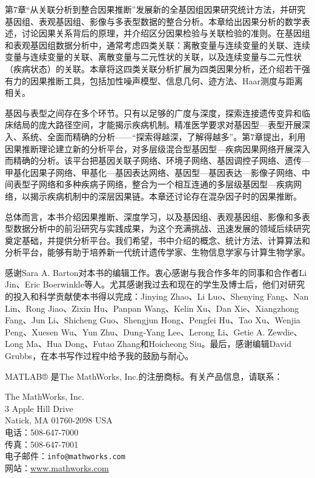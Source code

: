第7章“从关联分析到整合因果推断”发展新的全基因组因果研究统计方法，并研究基因组、表观基因组、影像与多表型数据的整合分析。本章给出因果分析的数学表述，讨论因果关系背后的原理，并介绍区分因果检验与关联检验的准则。在基因组和表观基因组数据分析中，通常考虑四类关联：离散变量与连续变量的关联、连续变量与连续变量的关联、离散变量与二元性状的关联，以及连续变量与二元性状（疾病状态）的关联。本章将这四类关联分析扩展为四类因果分析，还介绍若干强有力的因果推断工具，包括加性噪声模型、信息几何、迹方法、Haar测度与距离相关。

基因与表型之间存在多个环节。只有以足够的广度与深度，探索连接遗传变异和临床结局的庞大路径空间，才能揭示疾病机制。精准医学要求对基因型—表型开展深入、系统、全面而精确的分析——“探索得越深，了解得越多”。第7章提出，利用因果推断理论建立新的分析平台，对多层级混合型基因型—疾病因果网络开展深入而精确的分析。该平台把基因关联子网络、环境子网络、基因调控子网络、遗传—甲基化因果子网络、甲基化—基因表达网络、基因型—基因表达—影像子网络、中间表型子网络和多种疾病子网络，整合为一个相互连通的多层级基因型—疾病网络，以揭示疾病机制中的深层因果链。本章还讨论存在混杂因子时的因果推断。

总体而言，本书介绍因果推断、深度学习，以及基因组、表观基因组、影像和多表型数据分析中的前沿研究与实践成果，为这个充满挑战、迅速发展的领域后续研究奠定基础，并提供分析平台。我们希望，书中介绍的概念、统计方法、计算算法和分析平台，能够有助于培养新一代统计遗传学家、生物信息学家与计算生物学家。

感谢Sara A. Barton对本书的编辑工作。衷心感谢与我合作多年的同事和合作者Li Jin、Eric Boerwinkle等人。尤其感谢我过去和现在的学生及博士后，他们对研究的投入和科学贡献使本书得以完成：Jinying Zhao、Li Luo、Shenying Fang、Nan Lin、Rong Jiao、Zixin Hu、Panpan Wang、Kelin Xu、Dan Xie、Xiangzhong Fang、Jun Li、Shicheng Guo、Shengjun Hong、Pengfei Hu、Tao Xu、Wenjia Peng、Xuesen Wu、Yun Zhu、Dung-Yang Lee、Lerong Li、Getie A. Zewdie、Long Ma、Hua Dong、Futao Zhang和Hoicheong Siu。最后，感谢编辑David Grubbs，在本书写作过程中给予我的鼓励与耐心。

\medskip
MATLAB® 是The MathWorks, Inc.的注册商标。有关产品信息，请联系：
\begin{flushleft}
The MathWorks, Inc.\\
3 Apple Hill Drive\\
Natick, MA 01760-2098 USA\\
电话：508-647-7000\\
传真：508-647-7001\\
电子邮件：\texttt{info@mathworks.com}\\
网站：\url{www.mathworks.com}
\end{flushleft}

